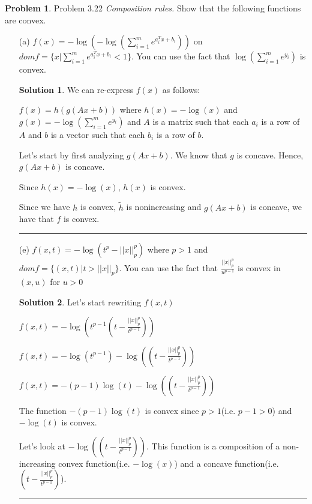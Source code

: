 \documentclass{article}
\theoremstyle{definition}
\newtheorem{problem}{Problem}
\def\fline{\rule{0.75\linewidth}{0.5pt}}
\newcommand{\finishline}{\begin{center}\fline\end{center}}
\newtheorem*{solution*}{Solution}
\newenvironment{solution}{\begin{solution*}}{{\finishline} \end{solution*}}
\begin{document}
\begin{problem} Problem 3.22
\textit{Composition rules.} Show that the following functions are convex.

\begin{itemize}
    \item[(a)] $f(x) = -\log(-\log(\sum_{i=1}^{m} e^{a_i^Tx + b_i}))$ on $dom f = \{ x | \sum_{i=1}^{m} e^{a_i^Tx + b_i} < 1\}$. You can use the fact that $\log(\sum_{i=1}^{m} e^{y_i})$ is convex. 

    \begin{solution}
        We can re-express $f(x)$ as follows: \newline 

        $f(x) = h(g(Ax + b))$ where $h(x) = - \log(x)$ and $g(x) = -\log(\sum_{i=1}^{m} e^{y_i})$ and $A$ is a matrix such that each $a_i$ is a row of $A$ and $b$ is a vector such that each $b_i$ is a row of $b$. 

        Let's start by first analyzing $g(Ax + b)$. We know that $g$ is concave. Hence, $g(Ax + b)$ is concave. 

        Since $h(x) = - \log(x)$, $h(x)$ is convex. 

        Since we have $h$ is convex, $\tilde{h}$ is nonincreasing and $g(Ax + b)$ is concave, we have that $f$ is convex. 
    \end{solution}

    \item[(e)] $f(x, t) = -\log(t^p - ||x||^p_p)$ where $p > 1$ and $dom f = \{(x, t) | t > ||x||_p \}$. You can use the fact that $\frac{||x||^p_p}{u^{p - 1}}$ is convex in $(x, u)$ for $u > 0$

    \begin{solution}
        Let's start rewriting $f(x, t)$ \newline 

        $f(x, t) = -\log(t^{p - 1}(t - \frac{||x||^p_p}{t^{p - 1}}))$ \newline 

        $f(x, t) = -\log(t^{p - 1}) - \log((t - \frac{||x||^p_p}{t^{p - 1}}))$

        $f(x, t) = -(p - 1)\log(t) - \log((t - \frac{||x||^p_p}{t^{p - 1}}))$

        The function $-(p - 1)\log(t)$ is convex since $p > 1$(i.e. $p - 1 > 0$) and $-\log(t)$ is convex. \newline 

        Let's look at $- \log((t - \frac{||x||^p_p}{t^{p - 1}}))$. This function is a composition of a non-increasing convex function(i.e. $-\log(x)$) and a concave function(i.e. $(t - \frac{||x||^p_p}{t^{p - 1}})$). 


\end{solution}
\end{itemize}
\end{problem}
\end{document}

